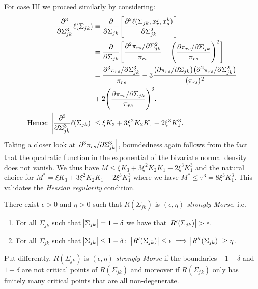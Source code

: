 \begin{condition}
    For case III we proceed similarly by considering:
    \begin{equation}
        \begin{split}
            \frac{\partial^3}{\partial\Sigma_{jk}^3}\ell(\Sigma_{jk}) &= \frac{\partial}{\partial\Sigma_{jk}}\Bigg[\frac{\partial^2 \ell(\Sigma_{jk}, x^j_r,x^k_s)}{\partial \Sigma_{jk}^{2}}\Bigg] \\
            &= \frac{\partial}{\partial\Sigma_{jk}}\Bigg[\frac{\partial^2 \pi_{rs}/\partial \Sigma_{jk}^{2}}{\pi_{rs}} - \Bigg(\frac{\partial \pi_{rs}/\partial \Sigma_{jk}}{\pi_{rs}}\Bigg)^2\Bigg] \\
            &= \frac{\partial^3 \pi_{rs} / \partial \Sigma_{jk}^3}{\pi_{rs}} - 3\frac{\big(\partial \pi_{rs} / \partial \Sigma_{jk}\big)\big( \partial^2 \pi_{rs} / \partial \Sigma_{jk}^2\big)}{(\pi_{rs})^2} \\
            &+ 2\Bigg(\frac{\partial \pi_{rs} / \partial \Sigma_{jk}}{\pi_{rs}}\Bigg)^3. \\
            \text{Hence: } \abs{\frac{\partial^3}{\partial\Sigma_{jk}^3}\ell(\Sigma_{jk})} &\leq \xi K_3 + 3\xi^2K_2K_1 + 2 \xi^3K_1^3.
        \end{split}        
    \end{equation}
    Taking a closer look at $\abs{\partial^3 \pi_{rs} / \partial \Sigma_{jk}^3}$, boundedness again follows from the fact that the quadratic function in the exponential of the bivariate normal density does not vanish. We thus have $M \leq \xi K_3 + 3\xi^2K_2K_1 + 2 \xi^3K_1^3$ and the natural choice for $M^* = \xi K_3 + 3\xi^2K_2K_1 + 2 \xi^3K_1^3$ where we have $M^* \leq \tau^3 = 8\xi^3K_1^3$. This validates the \textit{Hessian regularity} condition.      
    
    \begin{condition}
        There exist $\epsilon > 0$ and $\eta > 0$ such that $R(\Sigma_{jk})$ is $(\epsilon,\eta)$\textit{-strongly Morse}, i.e.
        \begin{enumerate}
            \item For all $\Sigma_{jk}$ such that $\abs{\Sigma_{jk}} = 1-\delta$ we have that $\abs{R^\prime(\Sigma_{jk})} > \epsilon$.
            \item For all $\Sigma_{jk}$ such that $\abs{\Sigma_{jk}} \leq 1-\delta$: $\ \abs{R^\prime(\Sigma_{jk})} \leq \epsilon \implies \abs{R^{\prime\prime}(\Sigma_{jk})} \geq \eta$.
        \end{enumerate}
        Put differently, $R(\Sigma_{jk})$ is $(\epsilon,\eta)$\textit{-strongly Morse} if the boundaries $-1+ \delta$ and $1-\delta$ are not critical points of $R(\Sigma_{jk})$ and moreover if $R(\Sigma_{jk})$ only has finitely many critical points that are all non-degenerate.    
        

\end{condition}
\end{condition}
